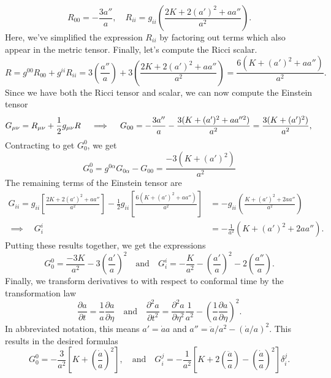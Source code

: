 \documentclass{lkx_pset}
\begin{document}
\begin{solution}
	\begin{equation}
		R_{00} =  -\frac{3a''}{a}, \quad
		R_{ii} = g_{ii}\left(\frac{2K + 2(a')^2 + aa''}{a^2}\right).
	\end{equation}
	Here, we've simplified the expression $R_{ii}$ by factoring out terms which also appear in the metric tensor. Finally, let's compute the Ricci scalar.
	\[
		R = g^{00} R_{00} + g^{ii}R_{ii}=
		3\left(\frac{a''}{a}\right) + 3\left(\frac{2K+2(a')^2 + aa''}{a^2}\right) = \frac{6(K+(a')^2+aa'')}{a^2}.
	\]
	Since we have both the Ricci tensor and scalar, we can now compute the Einstein tensor
	\[
		G_{\mu\nu} = R_{\mu\nu}+\frac{1}{2}g_{\mu\nu} R
		\quad\implies\quad
		G_{00} = -\frac{3a''}{a}-\frac{3(K+(a')^2+aa''^2)}{a^2} = \frac{3(K+(a')^2)}{a^2},\\
	\]
	Contracting to get $G^0_0$, we get
	\[
	  G_0^0 = g^{0\alpha}G_{0\alpha} -G_{00}= \frac{-3(K+(a')^2)}{a^2}
	\]
	The remaining terms of the Einstein tensor are
	\[
		\begin{aligned}
			G_{ii} = g_{ii}\left[\frac{2K + 2(a')^2 + aa''}{a^2}\right] - \frac{1}{2}g_{ii}\left[\frac{6(K+(a')^2 + aa'')}{a^2}\right] &= -g_{ii}\left(\frac{K+(a')^2 + 2aa''}{a^2}\right)\\
			\implies\quad G_i^i &= -\frac{1}{a^2}(K + (a')^2 + 2aa'').
		\end{aligned}
	\]
	Putting these results together, we get the expressions
	\[
    G_0^0 = \frac{-3K}{a^2} -3\left(\frac{a'}{a}\right)^2\quad\textrm{and}\quad G_i^i = -\frac{K}{a^2} - \left(\frac{a'}{a}\right)^2 - 2\left(\frac{a''}{a}\right).
	\]
	Finally, we transform derivatives to with respect to conformal time by the transformation law
	\[
		\frac{\partial a}{\partial t} = \frac{1}{a}\frac{\partial a}{\partial \eta} \quad\textrm{and}\quad \frac{\partial^2 a}{\partial t^2} = \frac{\partial^2 a}{\partial \eta^2}\frac{1}{a^2} - \left(\frac{1}{a}\frac{\partial a}{\partial \eta}\right)^2.
	\]
	In abbreviated notation, this means $a' = \dot{a}{a}$ and $a'' = \ddot{a}/a^2 - (\dot{a}/a)^2$.
	This results in the desired formulas
	\[
		\boxed{G_0^0 = -\frac{3}{a^2}\left[K + \left(\frac{\dot{a}}{a}\right)^2\right]},
		\quad\textrm{and}\quad
		\boxed{G_i^j = -\frac{1}{a^2}\left[K  + 2\left(\frac{\ddot{a}}{a}\right)- \left(\frac{\dot{a}}{a}\right)^2\right]\delta_i^j}.
	\]
\end{solution}
\end{document}
